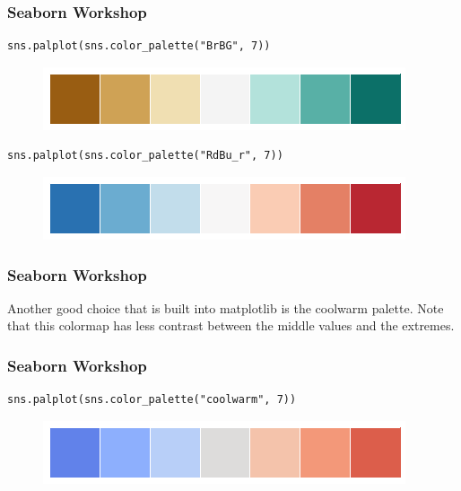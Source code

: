 \documentclass{beamer}
\begin{document}
\begin{frame}[fragile]
\frametitle{Seaborn Workshop}
\large
\begin{verbatim}
sns.palplot(sns.color_palette("BrBG", 7))
\end{verbatim}

\begin{figure}
\centering
\includegraphics[width=0.7\linewidth]{images/color_palettes_54_0}

\end{figure}

\begin{verbatim}
sns.palplot(sns.color_palette("RdBu_r", 7))
\end{verbatim}
\begin{figure}
\centering
\includegraphics[width=0.7\linewidth]{images/color_palettes_55_0}
\end{figure}

\end{frame}
\begin{frame}[fragile]
\frametitle{Seaborn Workshop}
\large


Another good choice that is built into matplotlib is the coolwarm palette. Note that this colormap has less contrast between the middle values and the extremes.
\end{frame}
\begin{frame}[fragile]
	\frametitle{Seaborn Workshop}
	\large
	
\begin{verbatim}
sns.palplot(sns.color_palette("coolwarm", 7))
\end{verbatim}

\begin{figure}
\centering
\includegraphics[width=0.7\linewidth]{images/color_palettes_57_0}
\end{figure}


\end{frame}
\end{document}
